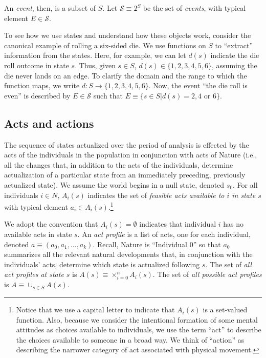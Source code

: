 \documentclass[
11pt,
titlepage,
reqno,
]{article}%
\theoremstyle{definition}
\begin{document}
	An \textit{event}, then, is a subset of $S$.  
	Let $\mathcal{S}\equiv 2^S$ be the set of \textit{events}, with typical element $E\in \mathcal{S}$.
	
	To see how we use states and understand how these objects work, consider the canonical example of rolling a six-sided die. 
	We use functions on $S$ to ``extract'' information from the states. 
	Here, for example, we can let $d(s)$ indicate the die roll outcome in state $s$.
	Thus, given $s\in S$, $d(s)\in\{1,2,3,4,5,6\}$, assuming the die never lands on an edge. 
	To clarify the domain and the range to which the function maps, we write $d:S\rightarrow \{1,2,3,4,5,6\}$.
	Now, the event ``the die roll is even'' is described by $E\in\mathcal{S}$ such that $E\equiv\{s\in S|d(s)=2,4\text{ or }6\}$. 
	
	\subsection{Acts and actions\label{sec:dynamics}}
	The sequence of states actualized over the period of analysis is effected by the acts of the individuals in the population in conjunction with acts of Nature (i.e., all the changes that, in addition to the acts of the individuals, determine actualization of a particular state from an immediately preceding, previously actualized state).
	We assume the world begins in a null state, denoted $s_0$. 
	For all individuals $i\in N$,  $A_i(s)$ indicates the set of \textit{feasible acts available to $i$ in state $s$} with typical element $a_i\in A_i(s)$.\footnote
	{
		Notice that we use a capital letter to indicate that $A_i(s)$ is a set-valued function. 
		Also, because we consider the intentional formation of some mental attitudes as choices available to individuals, we use the term ``act'' to describe the choices available to someone in a broad way.
		We think of ``action'' as describing the narrower category of act associated with physical movement.
	} 
	
	We adopt the convention that $A_i(s)=\emptyset$ indicates that individual $i$ has no available acts in state $s$.
	An \textit{act profile} is a list of acts, one for each individual, denoted  $a\equiv(a_0,a_1,\ldots,a_k)$. 
	Recall, Nature is ``Individual 0'' so that $a_0$ summarizes all the relevant natural developments that, in conjunction with the individuals' acts, determine which state is actualized following $s$. 
	The set of \textit{all act profiles at state $s$} is $A(s)\equiv \times_{i=0}^n A_i(s)$. 
	The set of \textit{all possible act profiles} is $A\equiv \cup_{s\in S} A(s)$. 
	
\end{document}

